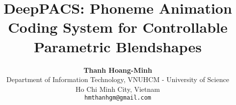 \documentclass[10pt,twocolumn,letterpaper]{article}
\title{DeepPACS: Phoneme Animation Coding System for Controllable Parametric Blendshapes}
\author{\textbf{Thanh Hoang-Minh \orcidlink{0009-0007-0898-5923}}\\
Department of Information Technology, VNUHCM - University of Science\\
Ho Chi Minh City, Vietnam \\
{\tt\small hmthanhgm@gmail.com}
}
\begin{document}
\maketitle
    







{
    \small
    
    
}


% 
\end{document}
